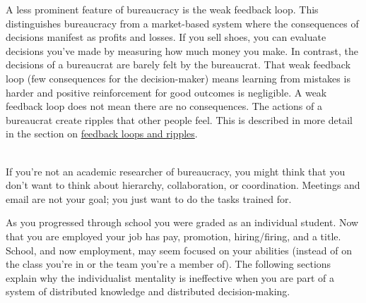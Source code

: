 A less prominent feature of bureaucracy is the weak 
\gls{feedback loop}. 
 \iftoggle{glossaryinmargin}{\marginpar{[Glossary]}}{} This distinguishes bureaucracy from a market-based system where the consequences of decisions manifest as profits and losses. If you sell shoes, you can evaluate decisions you've made by measuring how much money you make. In contrast, the decisions of a bureaucrat are barely felt by the bureaucrat. That weak feedback loop (few consequences for the decision-maker) means learning from mistakes is harder and positive reinforcement for good outcomes is negligible. A weak feedback loop does not mean there are no consequences. The actions of a bureaucrat create ripples that other people feel. This is described in more detail in the section on \hyperref[sec:feedback-loop-and-ripples]{feedback loops and ripples}.

\ \\

If you're not an academic researcher of bureaucracy, you might think that you don't want to think about hierarchy, collaboration, or coordination. Meetings and email are not your goal; you just want to do the tasks trained for. 

As you progressed through school you were graded as an individual student. Now that you are employed your job has pay, promotion, hiring/firing, and a title. School, and now employment, may seem focused on your abilities (instead of on the class you're in or the team you're a member of). The following sections explain why the individualist mentality is ineffective when you are part of a system of distributed knowledge and distributed decision-making. 


